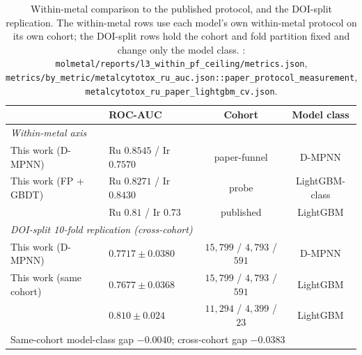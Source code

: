 \begin{table}[t]
\centering
\caption{Within-metal comparison to the published protocol, and the DOI-split
replication. The within-metal rows use each model's own within-metal protocol
on its own cohort; the DOI-split rows hold the cohort and fold partition fixed
and change only the model class. \MEASURED:
\texttt{molmetal/reports/l3\_within\_pf\_ceiling/metrics.json},
\texttt{metrics/by\_metric/metalcytotox\_ru\_auc.json::paper\_protocol\_measurement},
\texttt{metalcytotox\_ru\_paper\_lightgbm\_cv.json}.}
\label{tab:krasnov}
\small
\begin{tabular}{llcc}
\toprule
 & ROC-AUC & Cohort & Model class \\
\midrule
\multicolumn{4}{l}{\emph{Within-metal axis}}\\
This work (D-MPNN)        & Ru $0.8545$ / Ir $0.7570$ & paper-funnel & D-MPNN \\
This work (FP + GBDT)     & Ru $0.8271$ / Ir $0.8430$ & probe & LightGBM-class \\
\citet{krasnov2026metalcytotoxdb} & Ru $0.81$ / Ir $0.73$ & published & LightGBM \\
\midrule
\multicolumn{4}{l}{\emph{DOI-split 10-fold replication (cross-cohort)}}\\
This work (D-MPNN)        & $0.7717 \pm 0.0380$ & $15{,}799$ / $4{,}793$ / $591$ & D-MPNN \\
This work (same cohort)   & $0.7677 \pm 0.0368$ & $15{,}799$ / $4{,}793$ / $591$ & LightGBM \\
\citet{krasnov2026metalcytotoxdb} & $0.810 \pm 0.024$ & $11{,}294$ / $4{,}399$ / $23$ & LightGBM \\
\midrule
\multicolumn{4}{l}{Same-cohort model-class gap $-0.0040$; cross-cohort gap $-0.0383$} \\
\bottomrule
\end{tabular}
\end{table}

